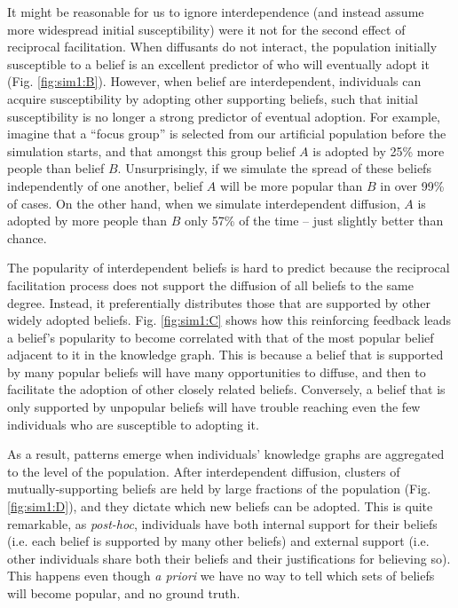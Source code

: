 \documentclass[9pt,twocolumn,twoside,lineno]{pnas-new}
\begin{document}
It might be reasonable for us to ignore interdependence (and instead assume more widespread initial susceptibility) were it not for the second effect of reciprocal facilitation. When diffusants do not interact, the population initially susceptible to a belief is an excellent predictor of who will eventually adopt it (Fig. \ref{fig:sim1:B}). However, when belief are interdependent, individuals can acquire susceptibility by adopting other supporting beliefs, such that initial susceptibility is no longer a strong predictor of eventual adoption. For example, imagine that a “focus group” is selected from our artificial population before the simulation starts, and that amongst this group belief $A$ is adopted by 25\% more people than belief $B$. Unsurprisingly, if we simulate the spread of these beliefs independently of one another, belief $A$ will be more popular than $B$ in over 99\% of cases. On the other hand, when we simulate interdependent diffusion, $A$ is adopted by more people than $B$ only 57\% of the time – just slightly better than chance.

The popularity of interdependent beliefs is hard to predict because the reciprocal facilitation process does not support the diffusion of all beliefs to the same degree. Instead, it preferentially distributes those that are supported by other widely adopted beliefs. Fig. \ref{fig:sim1:C} shows how this reinforcing feedback leads a belief’s popularity to become correlated with that of the most popular belief adjacent to it in the knowledge graph. This is because a belief that is supported by many popular beliefs will have many opportunities to diffuse, and then to facilitate the adoption of other closely related beliefs. Conversely, a belief that is only supported by unpopular beliefs will have trouble reaching even the few individuals who are susceptible to adopting it. 

As a result, patterns emerge when individuals' knowledge graphs are aggregated to the level of the population. After interdependent diffusion, clusters of mutually-supporting beliefs are held by large fractions of the population (Fig. \ref{fig:sim1:D}), and they dictate which new beliefs can be adopted. This is quite remarkable, as \textit{post-hoc}, individuals have both internal support for their beliefs (i.e. each belief is supported by many other beliefs) and external support (i.e. other individuals share both their beliefs and their justifications for believing so). This happens even though \textit{a priori} we have no way to tell which sets of beliefs will become popular, and no ground truth. 
\end{document}
